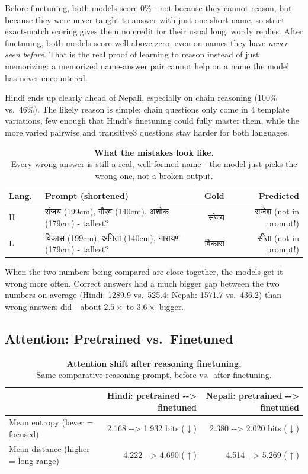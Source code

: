 \documentclass[11pt]{article}
\newcommand{\dn}[1]{{\devanagarifont #1}}
\newcommand{\figcap}[2]{\textbf{#1}\\[2pt]#2}
\begin{document}
Before finetuning, both models score 0\% - not because they cannot reason, but because they were never taught to answer with just one short name, so strict exact-match scoring gives them no credit for their usual long, wordy replies. After finetuning, both models score well above zero, even on names they have \emph{never seen before}. That is the real proof of learning to reason instead of just memorizing: a memorized name-answer pair cannot help on a name the model has never encountered.

Hindi ends up clearly ahead of Nepali, especially on chain reasoning (100\% vs.\ 46\%). The likely reason is simple: chain questions only come in 4 template variations, few enough that Hindi's finetuning could fully master them, while the more varied pairwise and transitive3 questions stay harder for both languages.

\begin{table}[h]
\centering \small
\begin{tabular}{lp{8.4cm}rr}
\toprule
Lang.\ & Prompt (shortened) & Gold & Predicted \\
\midrule
H & \dn{संजय} (199cm), \dn{गौरव} (140cm), \dn{अशोक} (179cm) - tallest? & \dn{संजय} & \dn{राजेश} (not in prompt!) \\
L & \dn{विकास} (199cm), \dn{अनिता} (140cm), \dn{नारायण} (179cm) - tallest? & \dn{विकास} & \dn{सीता} (not in prompt!) \\
\bottomrule
\end{tabular}
\caption{\figcap{What the mistakes look like.}{Every wrong answer is still a real, well-formed name - the model just picks the wrong one, not a broken output.}}
\end{table}

When the two numbers being compared are close together, the models get it wrong more often. Correct answers had a much bigger gap between the two numbers on average (Hindi: 1289.9 vs.\ 525.4; Nepali: 1571.7 vs.\ 436.2) than wrong answers did - about $2.5\times$ to $3.6\times$ bigger.

\subsection{Attention: Pretrained vs.\ Finetuned}

\begin{table}[h]
\centering \small
\begin{tabular}{lrr}
\toprule
 & Hindi: pretrained -{}-> finetuned & Nepali: pretrained -{}-> finetuned \\
\midrule
Mean entropy (lower = focused) & 2.168 -{}-> 1.932 bits ($\downarrow$) & 2.380 -{}-> 2.020 bits ($\downarrow$) \\
Mean distance (higher = long-range) & 4.222 -{}-> 4.690 ($\uparrow$) & 4.514 -{}-> 5.269 ($\uparrow$) \\
\bottomrule
\end{tabular}
\caption{\figcap{Attention shift after reasoning finetuning.}{Same comparative-reasoning prompt, before vs.\ after finetuning.}}
\end{table}
\end{document}
